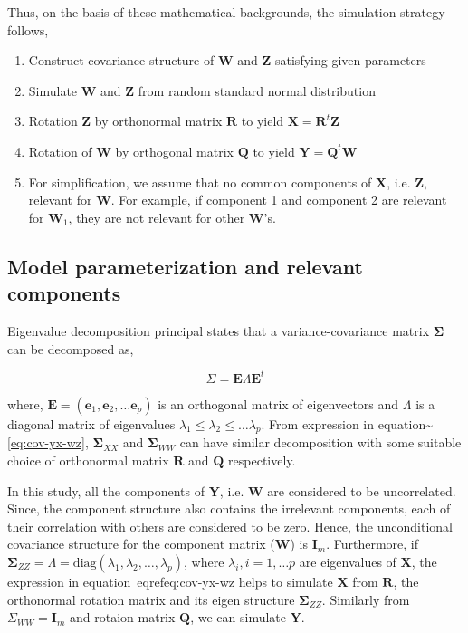 \documentclass[12pt,a4paperpaper,authoryear]{elsarticle} %
\providecommand{\tightlist}{%
  \setlength{\itemsep}{0pt}\setlength{\parskip}{0pt}}
\begin{document}
Thus, on the basis of these mathematical backgrounds, the simulation
strategy follows,

\begin{enumerate}
\def\labelenumi{\alph{enumi})}
\tightlist
\item
  Construct covariance structure of \(\mathbf{W}\) and \(\mathbf{Z}\)
  satisfying given parameters
\item
  Simulate \(\mathbf{W}\) and \(\mathbf{Z}\) from random standard normal
  distribution
\item
  Rotation \(\mathbf{Z}\) by orthonormal matrix \(\mathbf{R}\) to yield
  \(\mathbf{X} = \mathbf{R}^t \mathbf{Z}\)
\item
  Rotation of \(\mathbf{W}\) by orthogonal matrix \(\mathbf{Q}\) to
  yield \(\mathbf{Y} = \mathbf{Q}^t \mathbf{W}\)
\item
  For simplification, we assume that no common components of
  \(\mathbf{X}\), i.e. \(\mathbf{Z}\), relevant for \(\mathbf{W}\). For
  example, if component 1 and component 2 are relevant for
  \(\mathbf{W}_1\), they are not relevant for other \(\mathbf{W}\)'s.
\end{enumerate}

\subsection{Model parameterization and relevant
components}\label{model-parameter-relevant-components}

Eigenvalue decomposition principal states that a variance-covariance
matrix \(\boldsymbol{\Sigma}\) can be decomposed as,

\begin{equation}
  \Sigma = \mathbf{E}\Lambda \mathbf{E}^t
\end{equation}

where,
\(\mathbf{E} = (\mathbf{e}_1, \mathbf{e}_2, \ldots \mathbf{e}_p)\) is an
orthogonal matrix of eigenvectors and \(\Lambda\) is a diagonal matrix
of eigenvalues \(\lambda_1 \le \lambda_2 \le \ldots \lambda_p\). From
expression in equation\textasciitilde{}\eqref{eq:cov-yx-wz},
\(\boldsymbol{\Sigma}_{XX}\) and \(\boldsymbol{\Sigma}_{WW}\) can have
similar decomposition with some suitable choice of orthonormal matrix
\(\mathbf{R}\) and \(\mathbf{Q}\) respectively.

In this study, all the components of \(\mathbf{Y}\), i.e. \(\mathbf{W}\)
are considered to be uncorrelated. Since, the component structure also
contains the irrelevant components, each of their correlation with
others are considered to be zero. Hence, the unconditional covariance
structure for the component matrix (\(\mathbf{W}\)) is \(\mathbf{I}_m\).
Furthermore, if
\(\boldsymbol{\Sigma}_{ZZ} = \Lambda = \text{diag}({\lambda_1, \lambda_2, \ldots, \lambda_p})\),
where \(\lambda_i, i = 1, \ldots p\) are eigenvalues of \(\mathbf{X}\),
the expression in \mbox{equation~\\eqref{eq:cov-yx-wz}} helps to simulate
\(\mathbf{X}\) from \(\mathbf{R}\), the orthonormal rotation matrix and
its eigen structure \(\boldsymbol{\Sigma}_{ZZ}\). Similarly from
\(\Sigma_{WW} = \mathbf{I}_m\) and rotaion matrix \(\mathbf{Q}\), we can
simulate \(\mathbf{Y}\).
\end{document}
